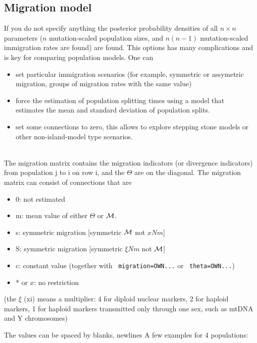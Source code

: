 \subsection{Migration model}
If you do not specify anything the posterior probability densities of all $n\times n$ parameters ($n$ mutation-scaled population sizes, and $n(n-1)$ mutation-scaled immigration rates are found) are found.
This options has many complications and is key for comparing population models. One can
\begin{itemize}
\item set particular immigration scenarios (for example, symmetric or assymetric migration, groups of migration rates with the same value)
\item force the estimation of population splitting times using a model that estimates the mean and standard deviation of population splits.
\item set some connections to zero, this allows to explore stepping stone models or other non-island-model type scenarios.
\end{itemize}

{}\\
The migration matrix contains the migration indicators (or divergence indicators) from population
j to i on row i, and the $\Theta$ are on the diagonal.
The migration matrix can consist of connections that are
\begin{itemize}
\item 0: not estimated
\item m: mean value of either $\Theta$ or $\mathcal{M}$.
\item s: symmetric migration [symmetric $\mathcal{M}$ not $xNm$]
\item S: symmetric migration [symmetric $\xi Nm$ not $\mathcal{M}$]
\item c: constant value (together with  \texttt{ migration=OWN...} 
or \texttt{ theta=OWN...})
\item * or $x$: no restriction
\end{itemize}
(the $\xi$ (xi) means a multiplier: 4 for diploid nuclear markers, 2 for haploid markers, 1 for haploid markers transmitted only through one sex, such as mtDNA and Y chromosomes)

The values can be spaced by blanks, newlines
A few examples for 4 populations:

